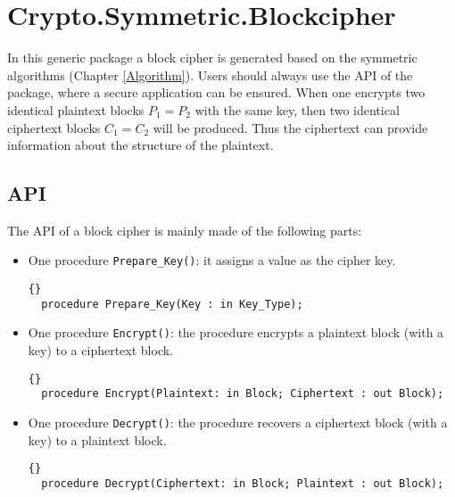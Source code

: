 \chapter{Crypto.Symmetric.Blockcipher}\label{Blockcipher}
In this generic package a block cipher is generated based on the symmetric algorithms (Chapter \ref{Algorithm}). Users should always use the API of the package, where a secure application can be ensured.
When one encrypts two identical plaintext blocks $P_1=P_2$ with the same key, then two identical ciphertext blocks $C_1=C_2$ will be produced. Thus the ciphertext can provide information about the structure of the plaintext.
\section{API}
The API of a block cipher is mainly made of the following parts:
\begin{itemize} 
\item One procedure \texttt{Prepare\_Key()}: it assigns a value as the cipher key.
\begin{lstlisting}{}
  procedure Prepare_Key(Key : in Key_Type);
\end{lstlisting}
\item One procedure \texttt{Encrypt()}: the procedure encrypts a plaintext block (with a key) to a ciphertext block.
\begin{lstlisting}{}
  procedure Encrypt(Plaintext: in Block; Ciphertext : out Block);
\end{lstlisting}
\item One procedure \texttt{Decrypt()}: the procedure recovers a ciphertext block (with a key) to a plaintext block.
\begin{lstlisting}{}
  procedure Decrypt(Ciphertext: in Block; Plaintext : out Block);
\end{lstlisting}
\end{itemize}
\newpage
